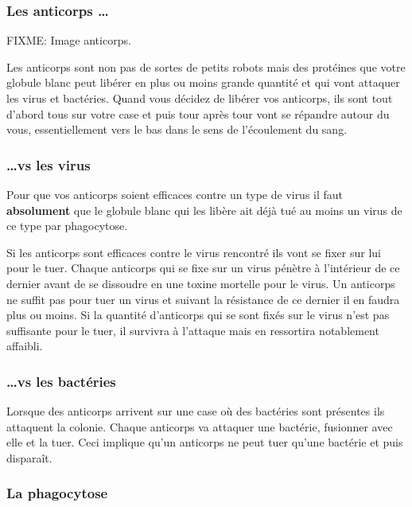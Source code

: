 \documentclass[a4paper,twoside,12pt]{article}
\begin{document}
    \subsubsection{Les anticorps \ldots}

    FIXME: Image anticorps.

    Les anticorps sont non pas de sortes de petits robots mais des protéines
    que votre globule blanc peut libérer en plus ou moins grande quantité et
    qui vont attaquer les virus et bactéries. Quand vous décidez de libérer
    vos anticorps, ils sont tout d'abord tous sur votre case et puis tour
    après tour vont se répandre autour du vous, essentiellement vers le bas
    dans le sens de l'écoulement du sang.

      \subsubsection*{\ldots vs les virus}

      Pour que vos anticorps soient efficaces contre un type de virus il faut
      \textbf{absolument} que le globule blanc qui les libère ait déjà tué au
      moins un virus de ce type par phagocytose.

      Si les anticorps sont efficaces contre le virus rencontré ils vont se
      fixer sur lui pour le tuer. Chaque anticorps qui se fixe sur un virus
      pénètre à l'intérieur de ce dernier avant de se dissoudre en une toxine
      mortelle pour le virus. Un anticorps ne suffit pas pour tuer un virus et
      suivant la résistance de ce dernier il en faudra plus ou moins. Si la
      quantité d'anticorps qui se sont fixés sur le virus n'est pas suffisante
      pour le tuer, il survivra à l'attaque mais en ressortira notablement
      affaibli.

      \subsubsection*{\ldots vs les bactéries}

      Lorsque des anticorps arrivent sur une case où des bactéries sont
      présentes ils attaquent la colonie. Chaque anticorps va attaquer une
      bactérie, fusionner avec elle et la tuer. Ceci implique qu'un anticorps
      ne peut tuer qu'une bactérie et puis disparaît.

    \subsubsection{La phagocytose}
\end{document}
